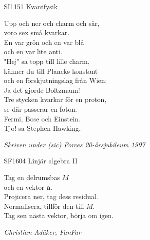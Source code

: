 \documentclass[a6paper,10pt]{article}
\begin{document}
\setlength{\oddsidemargin}{-0.37in}
\noindent
\begin{center}
\footnotesize SI1151 Kvantfysik\\
\end{center}
Upp och ner och charm och sär, \\
voro sex små kvarkar. \\
En var grön och en var blå \\
och en var lite anti. 
\vspace{5pt} \\
"Hej" sa topp till lille charm, \\
känner du till Plancks konstant \\
och en förskjutningslag från Wien; \\
Ja det gjorde Boltzmann! 
\vspace{5pt} \\
Tre stycken kvarkar för en proton, \\
se där passerar en foton. \\
Fermi, Bose och Einstein. \\
Tjo! sa Stephen Hawking. 
\begin{flushright}
\textit{Skriven under (sic) Forces 20-årsjubileum 1997}
\end{flushright}
\begin{center}
\footnotesize SF1604 Linjär algebra II\\
\end{center}
Tag en delrumsbas $M$\\
och en vektor $\boldsymbol{a}$.\\
Projicera ner, tag dess residual.\\
Normalisera, tillför den till $M$.\\
Tag sen nästa vektor, börja om igen.
\begin{flushright}
\textit{Christian Adåker, FanFar}
\end{flushright}



\setlength{\oddsidemargin}{-0.47in}
\noindent
\end{document}
